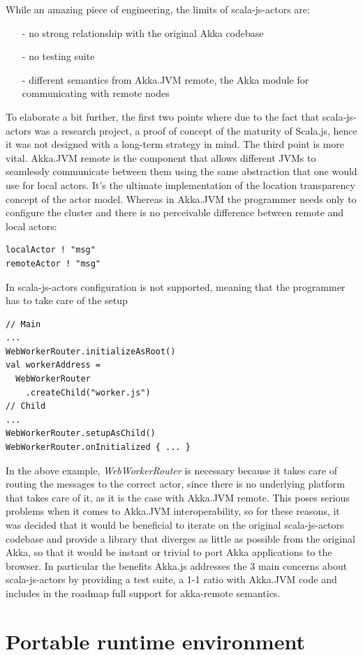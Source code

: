 \documentclass{sig-alternate}
\begin{document}
While an amazing piece of engineering, the limits of scala-js-actors are:
\begin{itemize}
\item[-] no strong relationship with the original Akka codebase
\item[-] no testing suite
\item[-] different semantics from Akka.JVM remote, the Akka module for communicating with remote nodes
\end{itemize}
To elaborate a bit further, the first two points where due to the fact that scala-js-actors was a research project, a proof of concept of the maturity of Scala.js, hence it was not designed with a long-term strategy in mind.
The third point is more vital. Akka.JVM remote is the component that allows different JVMs to seamlessly communicate between them using the same abstraction that one would use for local actors. It's the ultimate implementation of the location transparency concept of the actor model.
Whereas in Akka.JVM the programmer needs only to configure the cluster and there is no perceivable difference between
remote and local actors:
\begin{lstlisting}
localActor ! "msg"
remoteActor ! "msg"
\end{lstlisting}
In scala-js-actors configuration is not supported, meaning that the programmer has to take care of the setup
\begin{lstlisting}
// Main
...
WebWorkerRouter.initializeAsRoot()
val workerAddress =
  WebWorkerRouter
    .createChild("worker.js")
// Child
...
WebWorkerRouter.setupAsChild()
WebWorkerRouter.onInitialized { ... }
\end{lstlisting}
In the above example, \emph{WebWorkerRouter} is necessary because it takes care of routing the messages to the
correct actor, since there is no underlying platform that takes care of it, as it is the case with Akka.JVM remote.
This poses serious problems when it comes to Akka.JVM interoperability, so for these reasons, it was decided
that it would be beneficial to iterate on the original scala-js-actors codebase and provide a library that
diverges as little as possible from the original Akka, so that it would be instant or trivial to port Akka
applications to the browser.
In particular the benefits Akka.js addresses the 3 main concerns about scala-js-actors by providing a
test suite, a 1-1 ratio with Akka.JVM code and includes in the roadmap full support for akka-remote
semantics.

\section{Portable runtime environment}\label{sec:challenges}
\end{document}
